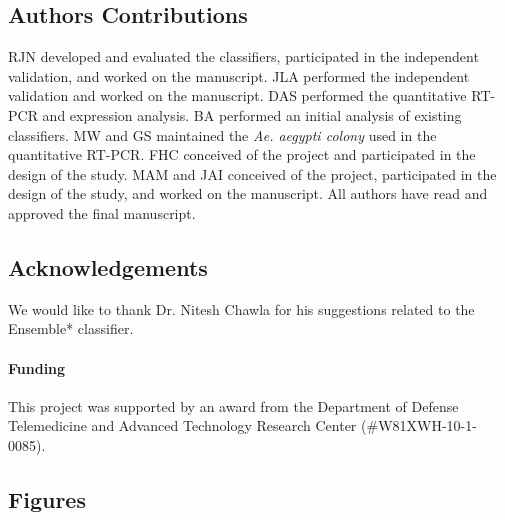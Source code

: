 \subsection{Authors Contributions}

RJN developed and evaluated the classifiers, participated in the independent validation, and worked on the manuscript. JLA performed the independent validation and worked on the manuscript.  DAS performed the quantitative RT-PCR and expression analysis. BA performed an initial analysis of existing classifiers. MW and GS maintained the \emph{Ae. aegypti colony} used in the quantitative RT-PCR.  FHC conceived of the project and participated in the design of the study.  MAM and JAI conceived of the project, participated in the design of the study, and worked on the manuscript. All authors have read and approved the final manuscript.


\subsection{Acknowledgements}

We would like to thank Dr. Nitesh Chawla for his suggestions related to the Ensemble* classifier.

\paragraph{Funding} This project was supported by an award from the Department of Defense Telemedicine and Advanced Technology Research Center (\#W81XWH-10-1-0085).  

\newpage

\subsection{Figures}


